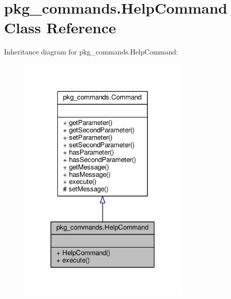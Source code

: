 \hypertarget{classpkg__commands_1_1HelpCommand}{\section{pkg\-\_\-commands.\-Help\-Command Class Reference}
\label{classpkg__commands_1_1HelpCommand}
}


Inheritance diagram for pkg\-\_\-commands.\-Help\-Command\-:
\nopagebreak
\begin{figure}[H]
\begin{center}
\leavevmode
\includegraphics[width=234pt]{classpkg__commands_1_1HelpCommand__inherit__graph}
\end{center}
\end{figure}


